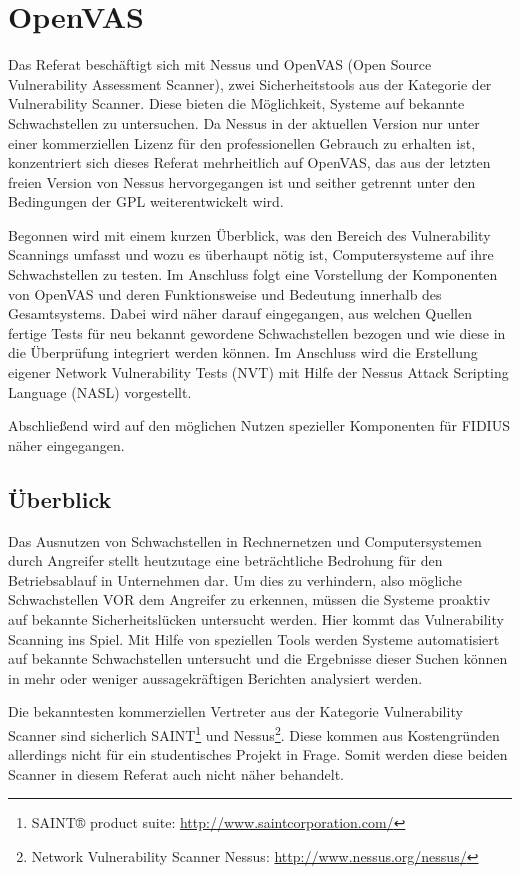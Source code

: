 \section{OpenVAS}
\authors{\JF}{}
\label{compositions:openvas}

Das Referat beschäftigt sich mit Nessus und OpenVAS (Open Source
Vulnerability Assessment Scanner), zwei Sicherheitstools aus der
Kategorie der Vulnerability Scanner. Diese bieten die Möglichkeit,
Systeme auf bekannte Schwachstellen zu untersuchen. Da Nessus in der
aktuellen Version nur unter einer kommerziellen Lizenz für den
professionellen Gebrauch zu erhalten ist, konzentriert sich dieses
Referat mehrheitlich auf OpenVAS, das aus der letzten freien Version
von Nessus hervorgegangen ist und seither getrennt unter den
Bedingungen der GPL weiterentwickelt wird.

Begonnen wird mit einem kurzen Überblick, was den Bereich des Vulnerability Scannings umfasst 
und wozu es überhaupt nötig ist, Computersysteme auf ihre Schwachstellen zu testen. Im 
Anschluss folgt eine Vorstellung der Komponenten von OpenVAS und deren Funktionsweise und 
Bedeutung innerhalb des Gesamtsystems. Dabei wird näher darauf eingegangen, aus welchen 
Quellen fertige Tests für neu bekannt gewordene Schwachstellen bezogen und wie diese in 
die Überprüfung integriert werden können. Im Anschluss wird die Erstellung eigener Network 
Vulnerability Tests (NVT) mit Hilfe der Nessus Attack Scripting Language (NASL) vorgestellt.

Abschließend wird auf den möglichen Nutzen spezieller Komponenten für FIDIUS näher eingegangen. 

\subsection{Überblick}

Das Ausnutzen von Schwachstellen in Rechnernetzen und Computersystemen durch Angreifer 
stellt heutzutage eine beträchtliche Bedrohung für den Betriebsablauf in Unternehmen dar. 
\cite{Staniford:2002}
Um dies zu verhindern, also mögliche Schwachstellen VOR dem Angreifer zu erkennen, müssen 
die Systeme proaktiv auf bekannte Sicherheitslücken untersucht werden. Hier kommt das 
Vulnerability Scanning ins Spiel. Mit Hilfe von speziellen Tools werden Systeme automatisiert 
auf bekannte Schwachstellen untersucht und die Ergebnisse dieser Suchen können in mehr oder 
weniger aussagekräftigen Berichten analysiert werden.   

Die bekanntesten kommerziellen Vertreter aus der Kategorie Vulnerability Scanner sind 
sicherlich SAINT\footnote{SAINT® product suite: \url{http://www.saintcorporation.com/}} 
und Nessus\footnote{Network Vulnerability Scanner Nessus: \url{http://www.nessus.org/nessus/}}. 
Diese kommen aus Kostengründen allerdings nicht für ein studentisches Projekt in Frage. 
Somit werden diese beiden Scanner in diesem Referat auch nicht näher behandelt.


